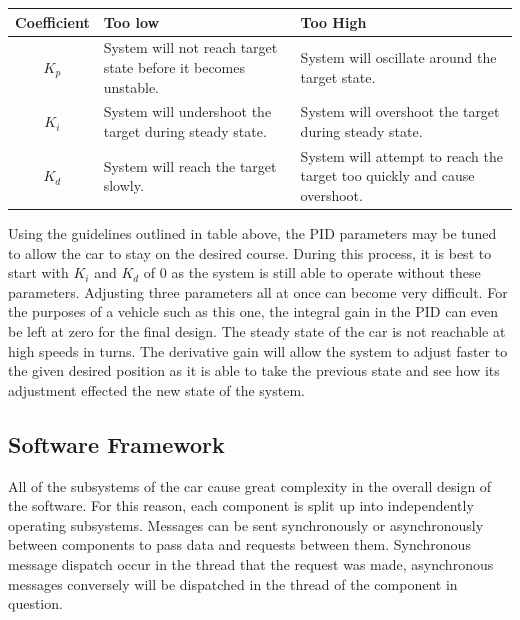 \documentclass{article}
\begin{document}
\begin{table}[htb]
	\renewcommand{\arraystretch}{1.2}
	\begin{tabularx}{\columnwidth}{|c|>{\raggedright\arraybackslash}X|>{\raggedright\arraybackslash}X|}
		\hline
		Coefficient & Too low & Too High \\
		\hline
		$K_p$ & System will not reach target state before it becomes unstable. & System will oscillate around the target state. \\
		\hline
		$K_i$ & System will undershoot the target during steady state. & System will overshoot the target during steady state. \\
		\hline
		$K_d$ & System will reach the target slowly. & System will attempt to reach the target too quickly and cause overshoot. \\
		\hline
	\end{tabularx}
	\label{tab:pid}
\end{table}

Using the guidelines outlined in table above, the PID parameters may be tuned to allow the car to stay on the desired course. During this process, it is best to start with $K_i$ and $K_d$ of $0$ as the system is still able to operate without these parameters. Adjusting three parameters all at once can become very difficult. For the purposes of a vehicle such as this one, the integral gain in the PID can even be left at zero for the final design. The steady state of the car is not reachable at high speeds in turns. The derivative gain will allow the system to adjust faster to the given desired position as it is able to take the previous state and see how its adjustment effected the new state of the system. 

\subsection{Software Framework}

All of the subsystems of the car cause great complexity in the overall design of the software. For this reason, each component is split up into independently operating subsystems. Messages can be sent synchronously or asynchronously between components to pass data and requests between them. Synchronous message dispatch occur in the thread that the request was made, asynchronous messages conversely will be dispatched in the thread of the component in question.
\end{document}
